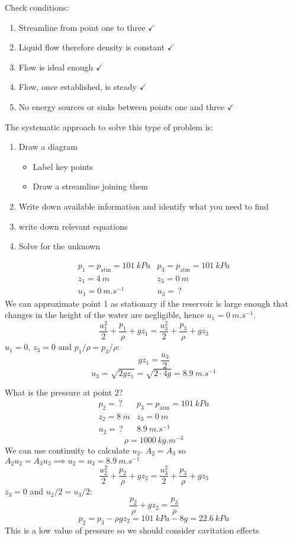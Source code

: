 \documentclass{article}
\begin{document}
    Check conditions:
    \begin{enumerate}
        \item Streamline from point one to three \(\checkmark\)
        \item Liquid flow therefore density is constant \(\checkmark\)
        \item Flow is ideal enough \(\checkmark\)
        \item Flow, once established, is steady \(\checkmark\)
        \item No energy sources or sinks between points one and three \(\checkmark\)
    \end{enumerate}
    The systematic approach to solve this type of problem is:
    \begin{enumerate}
        \item Draw a diagram
        \begin{itemize}
            \item Label key points
            \item Draw a streamline joining them
        \end{itemize}
        \item Write down available information and identify what you need to find
        \item write down relevant equations
        \item Solve for the unknown
    \end{enumerate}     
    \[
        \begin{array}{cc}
            p_1 = p_\text{atm} = \SI{101}{kPa} & p_3 = p_\text{atm} = \SI{101}{kPa}\\
            z_1 = \SI{4}{m} & z_3 = \SI{0}{m}\\
            u_1 = \SI{0}{m.s^{-1}} & u_3 = \,?
        \end{array}
    \]
    We can approximate point 1 as stationary if the reservoir is large enough that changes in the height of the water are negligible, hence \(u_1=\SI{0}{m.s^{-1}}\).
    \[\frac{u_1^2}{2} + \frac{p_1}{\rho} + gz_1 = \frac{u_3^2}{2} + \frac{p_3}{\rho} + gz_3\]
    \(u_1 = 0\), \(z_3 = 0\) and \(p_1/\rho = p_3/\rho\):
    \[gz_1 = \frac{u_3}{2}\]
    \[u_3 = \sqrt{2gz_1} = \sqrt{2\cdot 4g} = \SI{8.9}{m.s^{-1}}\]
    
    What is the pressure at point 2?
    \[
        \begin{array}{cc}
            p_2 = \,? & p_3 = p_\text{atm} = \SI{101}{kPa}\\
            z_2 = \SI{8}{m} & z_3 = \SI{0}{m}\\
            u_2 = \,? & \SI{8.9}{m.s^{-1}}
        \end{array}
    \]
    \[\rho = \SI{1000}{kg.m^{-3}}\]
    We can use continuity to calculate \(u_2\). \(A_2 = A_3\) so \(A_2u_2 = A_3u_3\implies u_2 = u_3 = \SI{8.9}{m.s^{-1}}\)
    \[\frac{u_2^2}{2} + \frac{p_2}{\rho} + gz_2 = \frac{u_3^2}{2} + \frac{p_3}{\rho} + gz_3\]
    \(z_3 = 0\) and \(u_2/2 = u_3/2\):
    \[\frac{p_2}{\rho} + gz_2 = \frac{p_3}{\rho}\]
    \[p_2 = p_3 - \rho gz_2 = \SI{101}{kPa} - 8g = \SI{22.6}{kPa}\]
    This is a low value of pressure so we should consider cavitation effects
    
\end{document}
